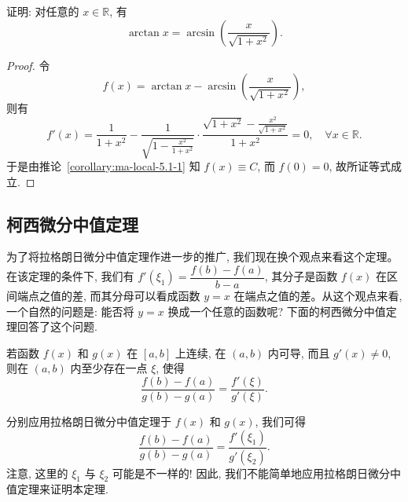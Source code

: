\begin{example}\label{example:ma-5-1-6}
证明: 对任意的 $x\in\mathbb{R}$, 有
\[
  \arctan x=\arcsin\left(\frac{x}{\sqrt{1+x^2}}\right).
\]
\end{example}


\begin{proof}
令
\[
  f(x)=\arctan x-\arcsin\left(\frac{x}{\sqrt{1+x^2}}\right),
\]
则有
\[
  f'(x)
  =
  \frac1{1+x^2}
  -
  \frac1{\sqrt{1-\frac{x^2}{1+x^2}}}
  \cdot
  \frac{\sqrt{1+x^2}-\frac{x^2}{\sqrt{1+x^2}}}{1+x^2}
  =
  0,\quad \forall x\in\mathbb{R}.
\]
于是由推论~\ref{corollary:ma-local-5.1-1} 知 $f(x)\equiv C$, 而 $f(0)=0$, 故所证等式成立.
\end{proof}


\subsection{柯西微分中值定理}
\label{subsec:ma-5-1-4}

为了将拉格朗日微分中值定理作进一步的推广, 我们现在换个观点来看这个定理。在该定理的条件下, 我们有 $f'(\xi_1)=\dfrac{f(b)-f(a)}{b-a}$, 其分子是函数 $f(x)$ 在区间端点之值的差, 而其分母可以看成函数 $y=x$ 在端点之值的差。从这个观点来看, 一个自然的问题是: 能否将 $y=x$ 换成一个任意的函数呢? 下面的柯西微分中值定理回答了这个问题.

\begin{theorem}[{柯西微分中值定理}]\label{theorem:ma-5-1-4}
若函数 $f(x)$ 和 $g(x)$ 在 $[a,b]$ 上连续, 在 $(a,b)$ 内可导, 而且 $g'(x)\ne0$, 则在 $(a,b)$ 内至少存在一点 $\xi$, 使得
\begin{equation}
  \frac{f(b)-f(a)}{g(b)-g(a)}=\frac{f'(\xi)}{g'(\xi)}.
  \label{eq:ma-5-1-2}
\end{equation}
\end{theorem}


\begin{remark}\label{remark:ma-5-source-28}
分别应用拉格朗日微分中值定理于 $f(x)$ 和 $g(x)$, 我们可得
\[
  \frac{f(b)-f(a)}{g(b)-g(a)}=\frac{f'(\xi_1)}{g'(\xi_2)}.
\]
注意, 这里的 $\xi_1$ 与 $\xi_2$ 可能是不一样的! 因此, 我们不能简单地应用拉格朗日微分中值定理来证明本定理.
\end{remark}


